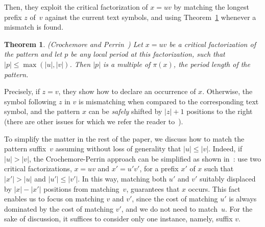 \documentclass[12pt]{article}
\newtheorem{theorem}{Theorem}[section]
\newtheorem{corollary}[theorem]{Corollary}
\begin{document}

Then, they exploit the critical factorization of $x=uv$ by matching the
longest prefix $z$ of~$v$ against the current text symbols, and using
Theorem~\ref{cp} whenever a mismatch is found.

\begin{theorem} \label{cp}
(Crochemore and Perrin~\cite{cp:91})
Let $x=uv$ be a critical factorization of the pattern and let $p$
be any local period at this factorization, such that $|p|\leq \max(|u|,|v|)$.
Then $|p|$ is a multiple of $\pi(x)$, the period length of the pattern.
\end{theorem}

Precisely, if $z=v$, they show how to declare an occurrence of $x$.
Otherwise, the symbol following $z$ in $v$ is mismatching when
compared to the corresponding text symbol, and the pattern $x$ can be
\emph{safely} shifted by $|z|+1$ positions to the right (there are
other issues for which we refer the reader to~\cite{cp:91}).




To simplify the matter in the rest of the paper, we discuss how to
match the pattern suffix~$v$ assuming without loss of generality that
$|u| \leq |v|$. Indeed, if $|u|> |v|$, the
Crochemore-Perrin approach can be simplified as shown in~\cite{bgm:11}: use
two critical factorizations, $x=uv$ and $x'=u'v'$, for a prefix $x'$
of $x$ such that $|x'| > |u|$ and $|u'| \leq |v'|$. In this way,
matching both $u'$ and $v'$ suitably displaced by $|x|-|x'|$ positions
from matching~$v$, guarantees that $x$ occurs.  This fact enables us
to focus on matching $v$ and $v'$, since the cost of matching $u'$ is
always dominated by the cost of matching $v'$, and we do not need to
match~$u$. For the sake of discussion, it suffices to consider only one instance,
namely, suffix $v$. %
\end{document}
